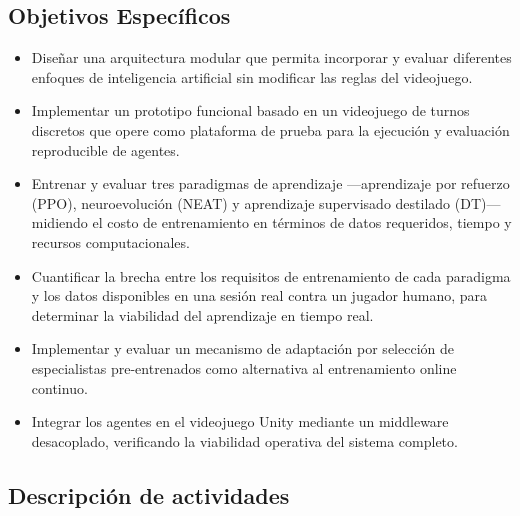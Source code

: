 \subsection{Objetivos Específicos}
\begin{itemize}
    \item Diseñar una arquitectura modular que permita incorporar y evaluar diferentes enfoques de inteligencia artificial sin modificar las reglas del videojuego.
    \item Implementar un prototipo funcional basado en un videojuego de turnos discretos que opere como plataforma de prueba para la ejecución y evaluación reproducible de agentes.
    \item Entrenar y evaluar tres paradigmas de aprendizaje ---aprendizaje por refuerzo (PPO), neuroevolución (NEAT) y aprendizaje supervisado destilado (DT)--- midiendo el costo de entrenamiento en términos de datos requeridos, tiempo y recursos computacionales.
    \item Cuantificar la brecha entre los requisitos de entrenamiento de cada paradigma y los datos disponibles en una sesión real contra un jugador humano, para determinar la viabilidad del aprendizaje en tiempo real.
    \item Implementar y evaluar un mecanismo de adaptación por selección de especialistas pre-entrenados como alternativa al entrenamiento online continuo.
    \item Integrar los agentes en el videojuego Unity mediante un middleware desacoplado, verificando la viabilidad operativa del sistema completo.
\end{itemize}

\subsection{Descripción de actividades}


